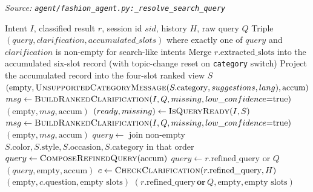 \begin{algorithm}[H]
\caption{Resolve the Search Query (Pre-Search Gating)}\label{alg:resolve_search_query}
\textit{Source: \texttt{agent/fashion\_agent.py:\_resolve\_search\_query}}
\begin{algorithmic}[1]
\Require Intent $I$, classified result $r$, session id $sid$, history $H$, raw query $Q$
\Ensure Triple $(query, clarification, accumulated\_slots)$ where exactly one of $query$ and $clarification$ is non-empty for search-like intents
        \State Merge $r.\text{extracted\_slots}$ into the accumulated six-slot record (with topic-change reset on \texttt{category} switch)
        \State Project the accumulated record into the four-slot ranked view $S$
            \State \Return $(\text{empty}, \textsc{UnsupportedCategoryMessage}(S.\text{category}, suggestions, lang), \text{accum})$
        \EndIf
        \State $msg \gets \textsc{BuildRankedClarification}(I, Q, missing, low\_confidence{=}\text{true})$
            \State \Return $(\text{empty}, msg, \text{accum})$
        \EndIf
        \State $(ready, missing) \gets \textsc{IsQueryReady}(I, S)$ 
            \State $msg \gets \textsc{BuildRankedClarification}(I, Q, missing, low\_confidence{=}\text{true})$
            \State \Return $(\text{empty}, msg, \text{accum})$
        \EndIf
        \State $query \gets$ join non-empty $S.\text{color}, S.\text{style}, S.\text{occasion}, S.\text{category}$ in that order
        \State $query \gets \textsc{ComposeRefinedQuery}(\text{accum})$\EndIf
        \State $query \gets r.\text{refined\_query}$ or $Q$\EndIf
        \State \Return $(query, \text{empty}, \text{accum})$
    \EndIf
        \State $c \gets \textsc{CheckClarification}(r.\text{refined\_query}, H)$
        \State \Return $(\text{empty}, c.\text{question}, \text{empty slots})$\EndIf
    \EndIf
    \State \Return $(r.\text{refined\_query}\,\textbf{or}\,Q, \text{empty}, \text{empty slots})$
\EndFunction
\end{algorithmic}
\end{algorithm}

